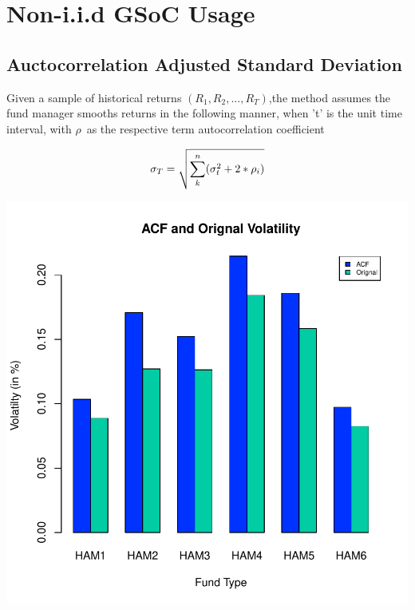 \documentclass[12pt,letterpaper,english]{article}
\begin{document}
\section{Non-i.i.d GSoC Usage}
\subsection{Auctocorrelation Adjusted Standard Deviation}
Given a sample of historical returns \((R_1,R_2, . . .,R_T)\),the method assumes the fund manager smooths returns in the following manner, when 't' is the unit time interval, with  $\rho$\ as the respective term autocorrelation coefficient

  
\begin{equation}
 \sigma_{T}  =   \sqrt{  \sum_k^n(\sigma_{t}^2 +  2*\rho_i) } \\
\end{equation}


\includegraphics{Managers-005}
\end{document}
